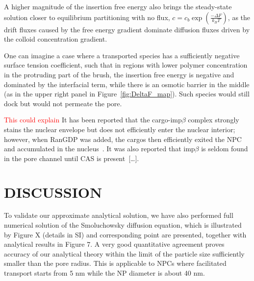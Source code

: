 \documentclass[12pt, a4paper]{article}
\newcommand\todo[1]{\textcolor{red}{#1}}
\begin{document}
A higher magnitude of the insertion free energy also brings the steady-state solution closer to equilibrium partitioning with no flux, $c = c_{b} \exp\left( \frac{-\Delta F}{k_B T} \right)$, as the drift fluxes caused by the free energy gradient dominate diffusion fluxes driven by the colloid concentration gradient.

One can imagine a case where a transported species has a sufficiently negative surface tension coefficient, such that in regions with lower polymer concentration in the protruding part of the brush, the insertion free energy is negative and dominated by the interfacial term, while there is an osmotic barrier in the middle (as in the upper right panel in Figure~\ref{fig:DeltaF_map}).
Such species would still dock but would not permeate the pore.

\todo{This could explain}
It has been reported that the cargo-imp$\beta$ complex strongly stains the nuclear envelope but does not efficiently enter the nuclear interior; however, when RanGDP was added, the cargos then efficiently exited the NPC and accumulated in the nucleus~\cite{Lowe2015}.
It was also reported that imp$\beta$ is seldom found in the pore channel until CAS is present~[\dots].


\section{DISCUSSION}


To validate our approximate analytical solution, we have also performed full numerical solution of the Smoluchowsky diffusion equation, which is illustrated by Figure X 
(details in SI) and corresponding point are presented, together with analytical results in Figure 7. A very good quantitative agreement proves accuracy of our analytical theory
within the limit of the particle size sufficiently smaller than the pore radius. This is applicable to NPCs where facilitated transport starts from 5 nm while the
NP diameter is about 40 nm.
\end{document}
